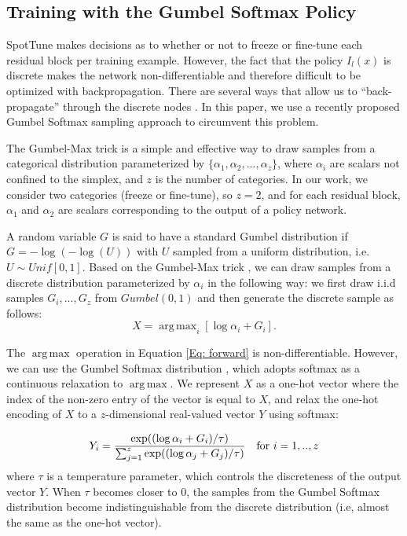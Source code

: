 \documentclass[10pt,twocolumn,letterpaper]{article}
\DeclareMathOperator*{\argmax}{arg\,max}
\begin{document}
\subsection{Training with the Gumbel Softmax Policy}\label{sec: gumbel}
SpotTune makes decisions as to whether or not to freeze or fine-tune each residual block per training example. However, the fact that the policy $I_l(x)$ is discrete makes the network non-differentiable and therefore difficult to be optimized with backpropagation. There are several ways that allow us to ``back-propagate'' through the discrete nodes \cite{bengio2013estimating}. In this paper, we use a recently proposed Gumbel Softmax sampling approach \cite{maddison2016concrete,jang2016categorical} to circumvent this problem. 

The Gumbel-Max trick \cite{maddison2016concrete} is a simple and effective way to draw samples from a categorical distribution parameterized by $\{\alpha_1, \alpha_2, ..., \alpha_z\}$, where $\alpha_i$ are scalars not confined to the simplex, and $z$ is the number of categories. In our work, we consider two categories (freeze or fine-tune), so $z=2$, and for each residual block, $\alpha_1$ and $\alpha_2$ are scalars corresponding to the output of a policy network.  

A random variable $G$ is said to have a standard Gumbel distribution if $G = -\log (- \log(U))$ with $U$ sampled from a uniform distribution, i.e. $U \sim Unif[0,1]$. Based on the Gumbel-Max trick \cite{maddison2016concrete}, we can draw samples from a discrete distribution parameterized by $\alpha_i$ in the following way: we first draw i.i.d samples $G_i, ..., G_z$ from $Gumbel(0,1)$ and then generate the discrete sample as follows:
\begin{equation} 
    X = \argmax_{i} [\log \alpha_i + G_i].
    \label{Eq: forward}
\end{equation}
 
  The $\argmax$ operation in Equation \ref{Eq: forward} is non-differentiable. However, we can use the Gumbel Softmax distribution  \cite{maddison2016concrete,jang2016categorical}, which adopts softmax as a continuous relaxation to $\argmax$. We represent $X$ as a one-hot vector where the index of the non-zero entry of the vector is equal to $X$, and relax the one-hot encoding of $X$ to a $z$-dimensional real-valued vector $Y$ using softmax:
 
 \begin{equation}
     Y_i = \frac{\exp((\log \alpha_i+ G_i)/\tau)} {\sum_{j=1}^{z} \exp((\log \alpha_j + G_j) / \tau)}  \quad \textnormal{for } i = 1,..,z
     \label{Eq: backward}
 \end{equation}
 where $\tau$ is a temperature parameter, which controls the discreteness of the output vector $Y$. When $\tau$ becomes closer to 0, the samples from the Gumbel Softmax distribution become indistinguishable from the discrete distribution (i.e, almost the same as the one-hot vector). 
 
\end{document}
